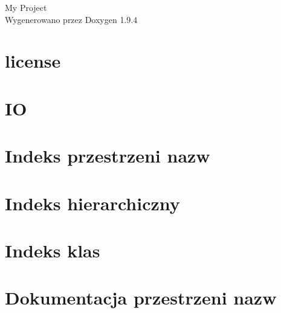 \documentclass[twoside]{book}
\newcommand{\+}{\discretionary{\mbox{\scriptsize$\hookleftarrow$}}{}{}}
\newcommand{\clearemptydoublepage}{%
    \newpage{\pagestyle{empty}\cleardoublepage}%
  }
\begin{document}
  \raggedbottom
    \hypersetup{pageanchor=false,
                bookmarksnumbered=true,
                pdfencoding=unicode
               }
  \begin{titlepage}
  \vspace*{7cm}
  \begin{center}%
  {\Large My Project}\\
  \vspace*{1cm}
  {\large Wygenerowano przez Doxygen 1.9.4}\\
  \end{center}
  \end{titlepage}
  \clearemptydoublepage
  \tableofcontents
  \clearemptydoublepage
  \hypersetup{pageanchor=true}
\chapter{license}
\label{md_packages__swift_excel_1_0_11_license}

\chapter{IO}
\label{md__r_e_a_d_m_e}

\chapter{Indeks przestrzeni nazw}

\chapter{Indeks hierarchiczny}

\chapter{Indeks klas}

\chapter{Dokumentacja przestrzeni nazw}






\end{document}
